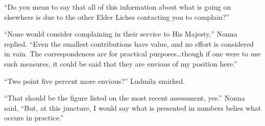  

“Do you mean to say that all of this information about what is going on elsewhere is due to the other Elder Liches contacting you to complain?”

 

“None would consider complaining in their service to His Majesty,” Nonna replied. “Even the smallest contributions have value, and no effort is considered in vain. The correspondences are for practical purposes…though if one were to use such measures, it could be said that they are envious of my position here.”

 

“Two point five percent more envious?” Ludmila smirked.

 

“That should be the figure listed on the most recent assessment, yes.” Nonna said, “But, at this juncture, I would say what is presented in numbers belies what occurs in practice.”